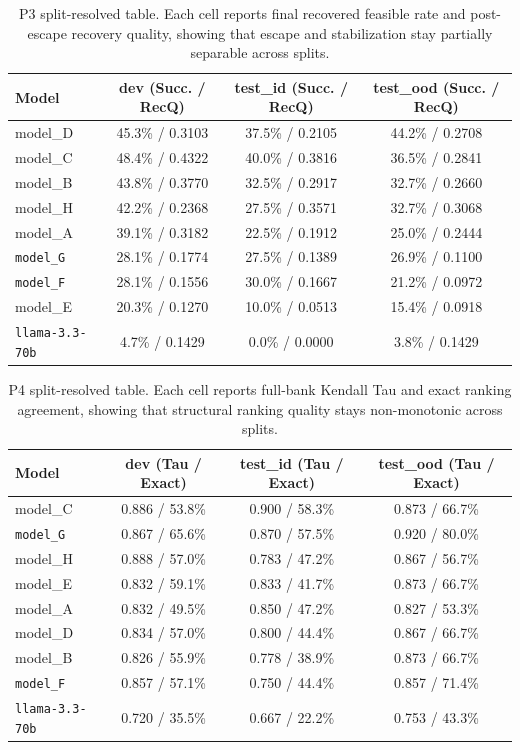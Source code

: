 \begin{table}[t]
\caption{P3 split-resolved table. Each cell reports final recovered feasible rate and post-escape recovery quality, showing that escape and stabilization stay partially separable across splits.}
\label{tab:appendix_p3_split}
\centering
\small
\begin{tabular}{lccc}
\toprule
Model & dev (Succ. / RecQ) & test\_id (Succ. / RecQ) & test\_ood (Succ. / RecQ) \\
\midrule
model_D & 45.3\% / 0.3103 & 37.5\% / 0.2105 & 44.2\% / 0.2708 \\
model_C & 48.4\% / 0.4322 & 40.0\% / 0.3816 & 36.5\% / 0.2841 \\
model_B & 43.8\% / 0.3770 & 32.5\% / 0.2917 & 32.7\% / 0.2660 \\
model_H & 42.2\% / 0.2368 & 27.5\% / 0.3571 & 32.7\% / 0.3068 \\
model_A & 39.1\% / 0.3182 & 22.5\% / 0.1912 & 25.0\% / 0.2444 \\
\texttt{model_G} & 28.1\% / 0.1774 & 27.5\% / 0.1389 & 26.9\% / 0.1100 \\
\texttt{model_F} & 28.1\% / 0.1556 & 30.0\% / 0.1667 & 21.2\% / 0.0972 \\
model_E & 20.3\% / 0.1270 & 10.0\% / 0.0513 & 15.4\% / 0.0918 \\
\texttt{llama-3.3-70b} & 4.7\% / 0.1429 & 0.0\% / 0.0000 & 3.8\% / 0.1429 \\
\bottomrule
\end{tabular}
\end{table}

\begin{table}[t]
\caption{P4 split-resolved table. Each cell reports full-bank Kendall Tau and exact ranking agreement, showing that structural ranking quality stays non-monotonic across splits.}
\label{tab:appendix_p4_split}
\centering
\small
\begin{tabular}{lccc}
\toprule
Model & dev (Tau / Exact) & test\_id (Tau / Exact) & test\_ood (Tau / Exact) \\
\midrule
model_C & 0.886 / 53.8\% & 0.900 / 58.3\% & 0.873 / 66.7\% \\
\texttt{model_G} & 0.867 / 65.6\% & 0.870 / 57.5\% & 0.920 / 80.0\% \\
model_H & 0.888 / 57.0\% & 0.783 / 47.2\% & 0.867 / 56.7\% \\
model_E & 0.832 / 59.1\% & 0.833 / 41.7\% & 0.873 / 66.7\% \\
model_A & 0.832 / 49.5\% & 0.850 / 47.2\% & 0.827 / 53.3\% \\
model_D & 0.834 / 57.0\% & 0.800 / 44.4\% & 0.867 / 66.7\% \\
model_B & 0.826 / 55.9\% & 0.778 / 38.9\% & 0.873 / 66.7\% \\
\texttt{model_F} & 0.857 / 57.1\% & 0.750 / 44.4\% & 0.857 / 71.4\% \\
\texttt{llama-3.3-70b} & 0.720 / 35.5\% & 0.667 / 22.2\% & 0.753 / 43.3\% \\
\bottomrule
\end{tabular}
\end{table}

